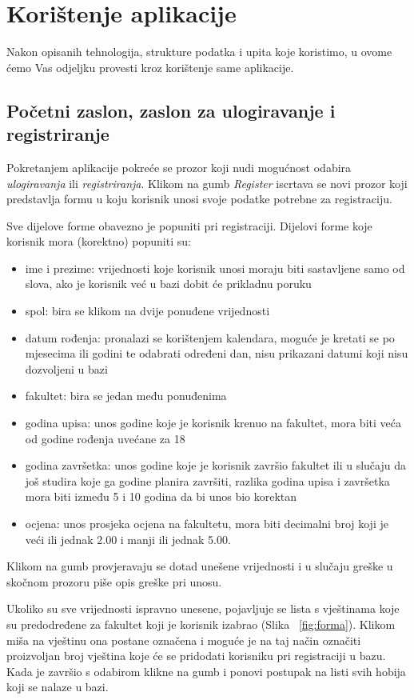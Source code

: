 \documentclass[titlepage, 12pt]{scrartcl}
\begin{document}
	
	\newpage
	\section{Korištenje aplikacije}
	Nakon opisanih tehnologija, strukture podatka i upita koje koristimo, u ovome ćemo Vas odjeljku provesti kroz korištenje same aplikacije. 
	
	\subsection{Početni zaslon, zaslon za ulogiravanje i registriranje}
	Pokretanjem aplikacije pokreće se prozor koji nudi mogućnost odabira \emph{ulogiravanja} ili \emph{registriranja}. Klikom na gumb \emph{Register} iscrtava se novi prozor koji predstavlja formu u koju korisnik unosi svoje podatke potrebne za registraciju. 
	
	Sve dijelove forme obavezno je popuniti pri registraciji. Dijelovi forme koje korisnik mora (korektno) popuniti su:
	\begin{itemize}
		\item ime i prezime: vrijednosti koje korisnik unosi moraju biti sastavljene samo od slova, ako je korisnik već u bazi dobit će prikladnu poruku
		\item spol: bira se klikom na dvije ponuđene vrijednosti
		\item datum rođenja: pronalazi se korištenjem kalendara, moguće je kretati se po mjesecima ili godini te odabrati određeni dan, nisu prikazani datumi koji nisu dozvoljeni u bazi
		\item fakultet: bira se jedan među ponuđenima
		\item godina upisa: unos godine koje je korisnik krenuo na fakultet, mora biti veća od godine rođenja uvećane za 18
		\item godina završetka: unos godine koje je korisnik završio fakultet ili u slučaju da još studira koje ga godine planira završiti, razlika godina upisa i završetka mora biti između 5 i 10 godina da bi unos bio korektan
		\item ocjena: unos prosjeka ocjena na fakultetu, mora biti decimalni broj koji je veći ili jednak 2.00 i manji ili jednak 5.00.
	\end{itemize}
	
	Klikom na gumb provjeravaju se dotad unešene vrijednosti i u slučaju greške u skočnom prozoru piše opis greške pri unosu. 
	
	Ukoliko su sve vrijednosti ispravno unesene, pojavljuje se lista s vještinama koje su predodređene za fakultet koji je korisnik izabrao (Slika ~\ref{fig:forma}). Klikom miša na vještinu ona postane označena i moguće je na taj način označiti proizvoljan broj vještina koje će se pridodati korisniku pri registraciji u bazu. Kada je završio s odabirom klikne na gumb i ponovi postupak na listi svih hobija koji se nalaze u bazi. 
	
\end{document}
